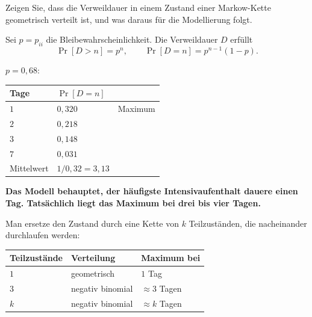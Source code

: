 \begin{aufgabe}
Zeigen Sie, dass die Verweildauer in einem Zustand einer Markow-Kette geometrisch verteilt ist, und was daraus für die Modellierung folgt.

\loesung
{}
Sei $p = p_{ii}$ die Bleibewahrscheinlichkeit. Die Verweildauer $D$ erfüllt
\[ \Pr[D > n] = p^{n} , \qquad \Pr[D = n] = p^{n-1}(1-p) . \]

$p = 0{,}68$:
\begin{center}
{\small
\renewcommand{\arraystretch}{1.46}
\begin{tabular}{@{}P{1.8cm}P{2.4cm}P{2.4cm}@{}}
\toprule
\textbf{Tage} & $\Pr[D = n]$ & \\
\midrule
$1$ & $0{,}320$ & \textcolor{akzent}{Maximum}\\
$2$ & $0{,}218$ & \\
$3$ & $0{,}148$ & \\
$7$ & $0{,}031$ & \\
\midrule
Mittelwert & $1/0{,}32 = 3{,}13$ & \\
\bottomrule
\end{tabular}}
\end{center}

\begin{center}
\begin{minipage}{0.9\textwidth}
\textbf{Das Modell behauptet, der häufigste Intensivaufenthalt dauere einen Tag. Tatsächlich liegt das Maximum bei drei bis vier Tagen.}
\end{minipage}
\end{center}

Man ersetze den Zustand durch eine Kette von $k$ Teilzuständen, die nacheinander durchlaufen werden:
\begin{center}
{\small
\renewcommand{\arraystretch}{1.48}
\begin{tabular}{@{}P{2.4cm}P{2.6cm}P{2.4cm}@{}}
\toprule
\textbf{Teilzustände} & \textbf{Verteilung} & \textbf{Maximum bei}\\
\midrule
$1$ & geometrisch & $1$ Tag\\
$3$ & negativ binomial & $\approx 3$ Tagen\\
$k$ & negativ binomial & $\approx k$ Tagen\\
\bottomrule
\end{tabular}}
\end{center}


\end{aufgabe}

